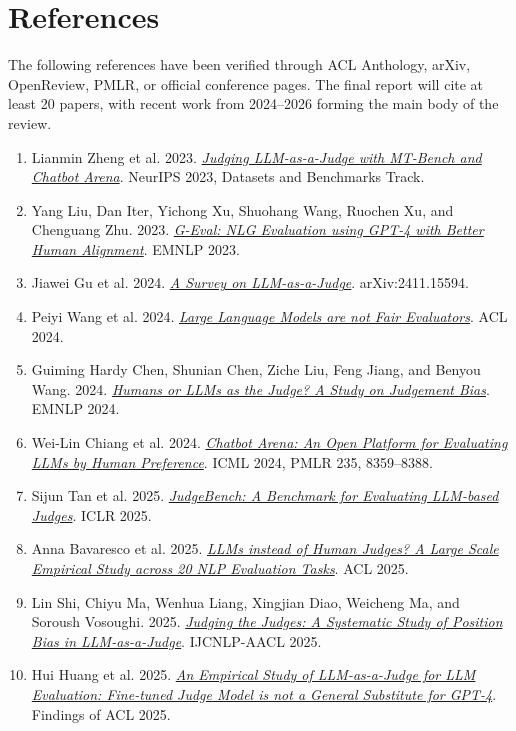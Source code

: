\documentclass[10pt]{article}
\begin{document}
\section*{References}
\small
The following references have been verified through ACL Anthology, arXiv, OpenReview, PMLR, or official conference pages. The final report will cite at least 20 papers, with recent work from 2024--2026 forming the main body of the review.
\begin{enumerate}[leftmargin=*,itemsep=0pt,topsep=1pt]
\item Lianmin Zheng et al. 2023. \href{https://arxiv.org/abs/2306.05685}{\textit{Judging LLM-as-a-Judge with MT-Bench and Chatbot Arena}}. NeurIPS 2023, Datasets and Benchmarks Track.
\item Yang Liu, Dan Iter, Yichong Xu, Shuohang Wang, Ruochen Xu, and Chenguang Zhu. 2023. \href{https://aclanthology.org/2023.emnlp-main.153/}{\textit{G-Eval: NLG Evaluation using GPT-4 with Better Human Alignment}}. EMNLP 2023.
\item Jiawei Gu et al. 2024. \href{https://arxiv.org/abs/2411.15594}{\textit{A Survey on LLM-as-a-Judge}}. arXiv:2411.15594.
\item Peiyi Wang et al. 2024. \href{https://aclanthology.org/2024.acl-long.511/}{\textit{Large Language Models are not Fair Evaluators}}. ACL 2024.
\item Guiming Hardy Chen, Shunian Chen, Ziche Liu, Feng Jiang, and Benyou Wang. 2024. \href{https://aclanthology.org/2024.emnlp-main.474/}{\textit{Humans or LLMs as the Judge? A Study on Judgement Bias}}. EMNLP 2024.
\item Wei-Lin Chiang et al. 2024. \href{https://proceedings.mlr.press/v235/chiang24b.html}{\textit{Chatbot Arena: An Open Platform for Evaluating LLMs by Human Preference}}. ICML 2024, PMLR 235, 8359--8388.
\item Sijun Tan et al. 2025. \href{https://arxiv.org/abs/2410.12784}{\textit{JudgeBench: A Benchmark for Evaluating LLM-based Judges}}. ICLR 2025.
\item Anna Bavaresco et al. 2025. \href{https://aclanthology.org/2025.acl-short.20/}{\textit{LLMs instead of Human Judges? A Large Scale Empirical Study across 20 NLP Evaluation Tasks}}. ACL 2025.
\item Lin Shi, Chiyu Ma, Wenhua Liang, Xingjian Diao, Weicheng Ma, and Soroush Vosoughi. 2025. \href{https://aclanthology.org/2025.ijcnlp-long.18/}{\textit{Judging the Judges: A Systematic Study of Position Bias in LLM-as-a-Judge}}. IJCNLP-AACL 2025.
\item Hui Huang et al. 2025. \href{https://aclanthology.org/2025.findings-acl.306/}{\textit{An Empirical Study of LLM-as-a-Judge for LLM Evaluation: Fine-tuned Judge Model is not a General Substitute for GPT-4}}. Findings of ACL 2025.

\end{enumerate}
\end{document}
